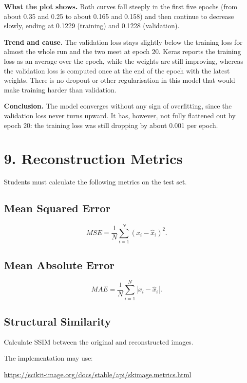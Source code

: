 \documentclass[10pt]{article}
\begin{document}
\textbf{What the plot shows.} Both curves fall steeply in the first five epochs
(from about 0.35 and 0.25 to about 0.165 and 0.158) and then continue to
decrease slowly, ending at 0.1229 (training) and 0.1228 (validation).

\textbf{Trend and cause.} The validation loss stays slightly below the training
loss for almost the whole run and the two meet at epoch 20. Keras reports the training loss as an
average over the epoch, while the weights are still improving, whereas the
validation loss is computed once at the end of the epoch with the latest
weights. There is no dropout or other regularisation in this model that would
make training harder than validation.

\textbf{Conclusion.} The model converges without any sign of overfitting, since
the validation loss never turns upward. It has, however, not fully flattened
out by epoch 20: the training loss was still dropping by about 0.001 per epoch.

\section*{9. Reconstruction Metrics}

Students must calculate the following metrics on the test set.

\subsection*{Mean Squared Error}

\[
MSE=
\frac{1}{N}
\sum_{i=1}^{N}
(x_i-\hat{x}_i)^2.
\]

\subsection*{Mean Absolute Error}

\[
MAE=
\frac{1}{N}
\sum_{i=1}^{N}
|x_i-\hat{x}_i|.
\]

\subsection*{Structural Similarity}

Calculate SSIM between the original and reconstructed images.

The implementation may use:

\url{https://scikit-image.org/docs/stable/api/skimage.metrics.html}
\end{document}
